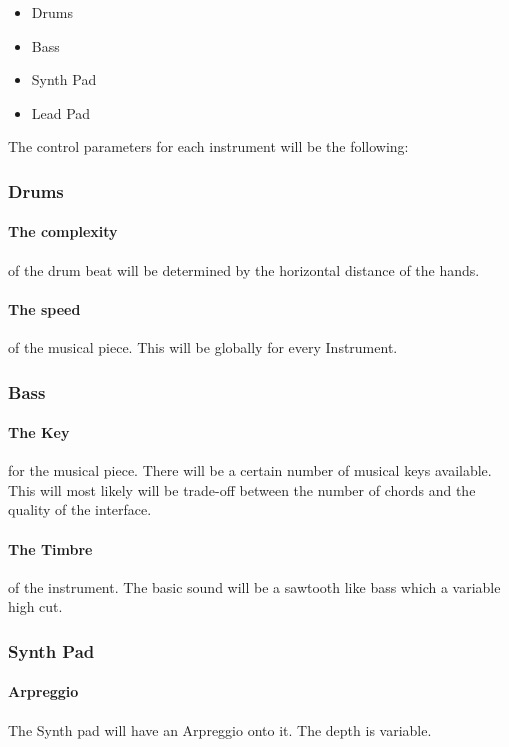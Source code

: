 \documentclass[titlepage, a4paper, 11pt]{scrartcl}
\begin{document}
\begin{itemize}
    \item Drums
    \item Bass
    \item Synth Pad
    \item Lead Pad
\end{itemize}

The control parameters for each instrument will be the following:

\subsubsection{Drums}

\paragraph{The complexity} of the drum beat will be determined by the horizontal distance of the hands.
\paragraph{The speed} of the musical piece. This will be globally for every Instrument.

\subsubsection{Bass} \label{bass}

\paragraph{The Key} for the musical piece. There will be a certain number of musical keys available. This will most likely will be trade-off between the number of chords and the quality of the interface.
\paragraph{The Timbre} of the instrument. The basic sound will be a sawtooth like bass which a variable high cut.

\subsubsection{Synth Pad}

\paragraph{Arpreggio} The Synth pad will have an Arpreggio onto it. The depth is variable.
\end{document}
